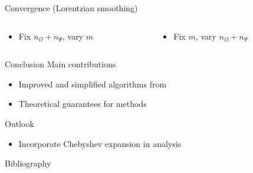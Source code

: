 \documentclass[aspectratio=169, 12pt]{beamer}
\begin{document}
\begin{frame}{Convergence (Lorentzian smoothing)}
    \begin{columns}
        \begin{column}{0.5\textwidth}
            \begin{itemize}
                \item Fix $n_{\Omega} + n_{\Psi}$, vary $m$
            \end{itemize}
            \scalebox{1.0}{}
        \end{column}
        \begin{column}{0.5\textwidth}
            \begin{itemize}
                \item Fix $m$, vary $n_{\Omega} + n_{\Psi}$
            \end{itemize}
            \scalebox{1.0}{}
        \end{column}
    \end{columns}
\end{frame}

\begin{frame}{Conclusion}
    Main contributions
    \begin{itemize}
        \item Improved and simplified algorithms from \cite{lin2017randomized}
        \item Theoretical guarantees for methods
    \end{itemize}
    Outlook
    \begin{itemize}
        \item Incorporate Chebyshev expansion in analysis
    \end{itemize}
\end{frame}

\begin{frame}[allowframebreaks]{Bibliography}
    
\end{frame}
\end{document}
